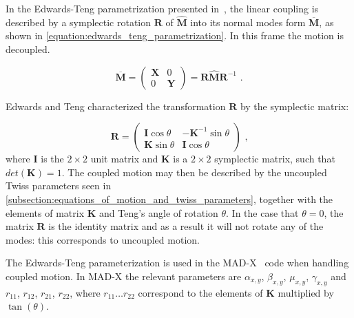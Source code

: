 In the Edwards-Teng parametrization presented in~\cite{IEEE:Edwards:Parametrization_Linear_Coupled_Motion}, the linear coupling is described by a symplectic rotation \(\mathbf{R}\) of \(\hat{\mathbf{M}}\) into its normal modes form \(\overline{\mathbf{M}}\), as shown in \cref{equation:edwards_teng_parametrization}.
In this frame the motion is decoupled.

\begin{equation}
    \overline{\mathbf{M}} = \left(
        \begin{array}{cc}
            \mathbf{X} & 0 \\
            0 & \mathbf{Y}
    \end{array} \right) = \mathbf{R} \hat{\mathbf{M}} \mathbf{R}^{-1} \text{ .}
    \label{equation:edwards_teng_parametrization}
\end{equation}

Edwards and Teng characterized the transformation \(\mathbf{R}\) by the symplectic matrix:

\begin{equation}
    \mathbf{R} =\left(
        \begin{array}{cc}
            \mathbf{I} \cos \theta & -\mathbf{K}^{-1} \sin \theta \\
            \mathbf{K} \sin \theta & \mathbf{I} \cos \theta
    \end{array} \right) \text{ ,}
    \label{equation:edwards_teng_rotation_matrix}
\end{equation}
where \(\mathbf{I}\) is the \(2 \times 2\) unit matrix and \(\mathbf{K}\) is a \(2 \times 2\) symplectic matrix, such that \(det(\mathbf{K}) = 1\).
The coupled motion may then be described by the uncoupled Twiss parameters seen in \cref{subsection:equations_of_motion_and_twiss_parameters}, together with the elements of matrix \(\mathbf{K}\) and Teng's angle of rotation \(\theta\).
In the case that \(\theta = 0\), the matrix \(\mathbf{R}\) is the identity matrix and as a result it will not rotate any of the modes: this corresponds to uncoupled motion.

The Edwards-Teng parameterization is used in the MAD-X~\cite{CODE:MADX_guide} code when handling coupled motion.
In MAD-X the relevant parameters are \(\alpha_{x, y}\), \(\beta_{x, y}\), \(\mu_{x, y}\), \(\gamma_{x, y}\) and \(r_{11}\), \(r_{12}\), \(r_{21}\), \(r_{22}\), where \(r_{11} \ldots r_{22}\) correspond to the elements of \(\mathbf{K}\) multiplied by \(\tan(\theta)\).

